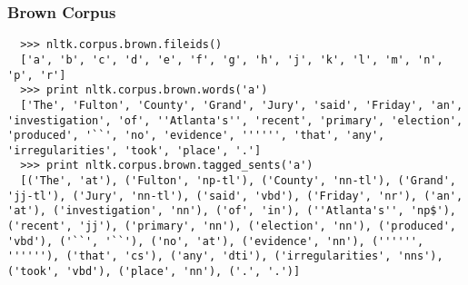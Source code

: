 \begin{frame}[fragile]\frametitle{Brown Corpus}
\scriptsize

\begin{lstlisting}
  >>> nltk.corpus.brown.fileids()
  ['a', 'b', 'c', 'd', 'e', 'f', 'g', 'h', 'j', 'k', 'l', 'm', 'n', 'p', 'r']
  >>> print nltk.corpus.brown.words('a')
  ['The', 'Fulton', 'County', 'Grand', 'Jury', 'said', 'Friday', 'an', 'investigation', 'of', ''Atlanta's'', 'recent', 'primary', 'election', 'produced', '``', 'no', 'evidence', '''''', 'that', 'any', 'irregularities', 'took', 'place', '.']
  >>> print nltk.corpus.brown.tagged_sents('a')
  [('The', 'at'), ('Fulton', 'np-tl'), ('County', 'nn-tl'), ('Grand', 'jj-tl'), ('Jury', 'nn-tl'), ('said', 'vbd'), ('Friday', 'nr'), ('an', 'at'), ('investigation', 'nn'), ('of', 'in'), (''Atlanta's'', 'np$'), ('recent', 'jj'), ('primary', 'nn'), ('election', 'nn'), ('produced', 'vbd'), ('``', '``'), ('no', 'at'), ('evidence', 'nn'), ('''''', ''''''), ('that', 'cs'), ('any', 'dti'), ('irregularities', 'nns'), ('took', 'vbd'), ('place', 'nn'), ('.', '.')]
\end{lstlisting}
\end{frame}









